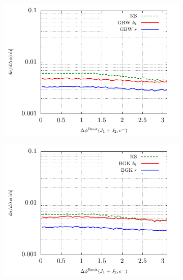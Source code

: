 \documentclass[11pt]{article}
\numberwithin{equation}{section}
\numberwithin{table}{section}
\numberwithin{figure}{section}
\begin{document}
\begin{figure}[p]
	\begin{subfigure}{0.5\textwidth}
	\includegraphics[width=\textwidth]{plots/plotGBW1} 
	\end{subfigure}
	\begin{subfigure}{0.5\textwidth}
	\includegraphics[width=\textwidth]{plots/plotBGK1} 
	\end{subfigure}
	\begin{subfigure}{0.5\textwidth}

\end{subfigure}
\end{figure}
\end{document}
